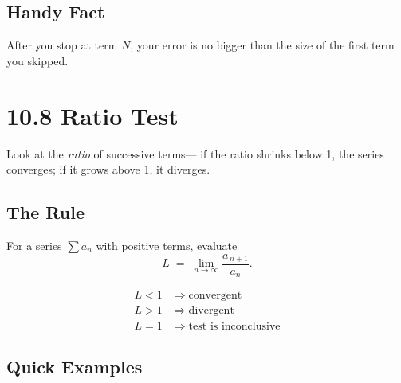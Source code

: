 \documentclass{article}
\begin{document}
\subsection*{Handy Fact}
After you stop at term \(N\), your error is no bigger than the size of the first term you skipped.

\vspace{4pt}
\begin{center}
\end{center}

\newpage
\section{10.8 Ratio Test}

\begin{tcolorbox}[colback=gray!8,colframe=black,title=Big-Idea (one line)]
Look at the \emph{ratio} of successive terms—
if the ratio shrinks below 1, the series converges; if it grows above 1, it diverges.
\end{tcolorbox}

\subsection*{The Rule}

For a series \(\sum a_n\) with positive terms, evaluate
\[
L \;=\; \lim_{n\to\infty} \frac{a_{\,n+1}}{a_n}.
\]

\[
\boxed{
\begin{aligned}
L < 1 &\;\Longrightarrow\; \text{convergent}\\
L > 1 &\;\Longrightarrow\; \text{divergent}\\
L = 1 &\;\Longrightarrow\; \text{test is inconclusive}
\end{aligned}}
\]

\subsection*{Quick Examples}
\end{document}
